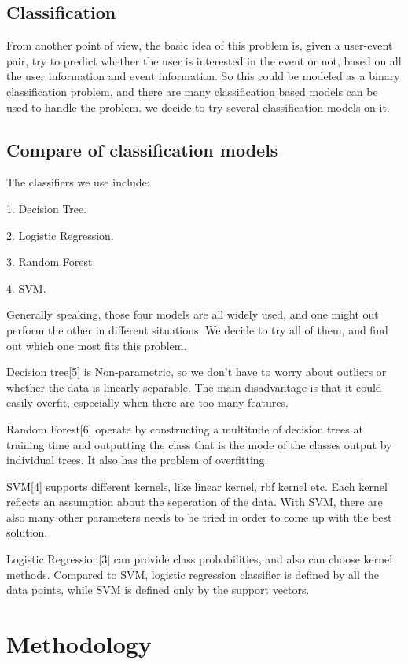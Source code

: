 \documentclass{article} %
\begin{document}
\subsection{Classification}

From another point of view, the basic idea of this problem is, given a user-event pair, try to predict whether the user is interested in the event or not, based on all the user information and event information. So this could be modeled as a binary classification problem, and there are many classification based models can be used to handle the problem. we decide to try several classification models on it.


\subsection{Compare of classification models}
The classifiers we use include:

1. Decision Tree.

2. Logistic Regression.

3. Random Forest.

4. SVM.

Generally speaking, those four models are all widely used, and one might out perform the other in different situations. We decide to try all of them, and find out which one most fits this problem.

Decision tree[5] is Non-parametric, so we don't have to worry about outliers or whether the data is linearly separable. The main disadvantage is that it could easily overfit, especially when there are too many features.

Random Forest[6] operate by constructing a multitude of decision trees at training time and outputting the class that is the mode of the classes output by individual trees. It also has the problem of overfitting. 

SVM[4] supports different kernels, like linear kernel, rbf kernel etc. Each kernel reflects an assumption about the seperation of the data. With SVM, there are also many other parameters needs to be tried in order to come up with the best solution. 

Logistic Regression[3] can provide class probabilities, and also can choose kernel methods. Compared to SVM, logistic regression classifier is defined by all the data points, while SVM is defined only by the support vectors.  


\section{Methodology}
\end{document}
